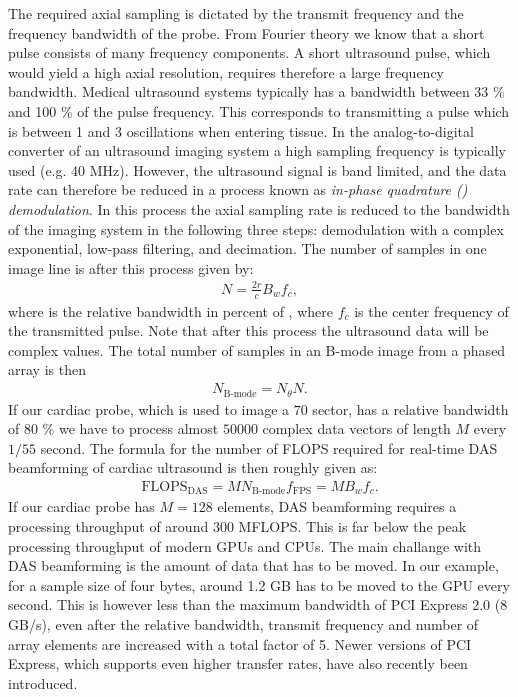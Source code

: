 The required axial sampling is dictated by the transmit frequency and the frequency bandwidth of the probe. From Fourier theory we know that a short pulse consists of many frequency components. A short ultrasound pulse, which would yield a high axial resolution, requires therefore a large frequency bandwidth. Medical ultrasound systems typically has a bandwidth between 33 \% and 100 \% of the pulse frequency. This corresponds to transmitting a pulse which is between 1 and 3 oscillations when entering tissue. In the analog-to-digital converter of an ultrasound imaging system a high sampling frequency is typically used (e.g. 40 MHz). However, the ultrasound signal is band limited, and the data rate can therefore be reduced in a process known as \textit{in-phase quadrature () demodulation}. In this process the axial sampling rate is reduced to the bandwidth of the imaging system in the following three steps: demodulation with a complex exponential, low-pass filtering, and decimation. The number of samples in one image line is after this process given by:
\begin{align}
N = \frac{2r}{c}B_wf_c,
\end{align}
where  is the relative bandwidth in percent of , where $f_c$ is the center frequency of the transmitted pulse. Note that after this process the ultrasound data will be complex values. The total number of samples in an B-mode image from a phased array is then 
\begin{align}
N_{\text{B-mode}} = N_\theta N.
\end{align}
If our cardiac probe, which is used to image a $70$\degree{} sector, has a relative bandwidth of $80$ \% we have to process almost $50000$ complex data vectors of length $M$ every $1/55$ second. The formula for the number of FLOPS required for real-time DAS beamforming of cardiac ultrasound is then roughly given as:
\begin{align}
\text{FLOPS}_{\text{DAS}} = MN_{\text{B-mode}}f_{\text{FPS}} = MB_wf_c.
\end{align}
If our cardiac probe has $M=128$ elements, DAS beamforming requires a processing throughput of around $300$ MFLOPS. This is far below the peak processing throughput of modern GPUs and CPUs. The main challange with DAS beamforming is the amount of data that has to be moved. In our example, for a sample size of four bytes, around 1.2 GB has to be moved to the GPU every second. This is however less than the maximum bandwidth of PCI Express 2.0 (8 GB/s), even after the relative bandwidth, transmit frequency and number of array elements are increased with a total factor of 5. Newer versions of PCI Express, which supports even higher transfer rates, have also recently been introduced.


